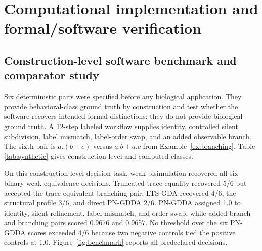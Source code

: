 \documentclass{ws-jbcb}
\numberwithin{equation}{section}
\begin{document}
\section{Computational implementation and formal/software verification}
\label{sec:computational-validation}

\subsection{Construction-level software benchmark and comparator study}
\label{sec:benchmark-method}

Six deterministic pairs were specified before any biological application. They
provide behavioral-class ground truth by construction and test whether the
software recovers intended formal distinctions; they do not provide biological
ground truth. A
12-step labeled workflow supplies identity, controlled silent subdivision, label
mismatch, label-order swap, and an added observable branch. The sixth pair is
$a.(b+c)$ versus $a.b+a.c$ from Example~\ref{ex:branching}. Table
\ref{tab:synthetic} gives construction-level and computed classes.

\begin{table}[t]
\end{table}

On this construction-level decision task, weak bisimulation recovered all six
binary weak-equivalence decisions. Truncated
trace equality recovered 5/6 but accepted the trace-equivalent branching pair;
LTS-GDA recovered 4/6, the structural profile 3/6, and direct PN-GDDA 2/6.
PN-GDDA assigned 1.0 to identity, silent refinement, label mismatch, and order
swap, while added-branch and branching pairs scored 0.9676 and 0.9657. No
threshold over the six PN-GDDA scores exceeded 4/6 because two negative controls
tied the positive controls at 1.0. Figure~\ref{fig:benchmark} reports all
predeclared decisions.
\end{document}
